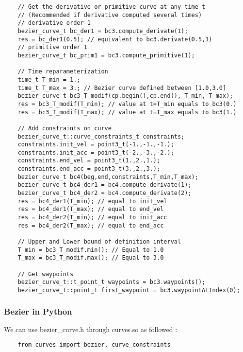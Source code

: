 \documentclass{article}
\begin{document}
\begin{lstlisting}
    // Get the derivative or primitive curve at any time t
    // (Recommended if derivative computed several times)
    // derivative order 1
    bezier_curve_t bc_der1 = bc3.compute_derivate(1);
    res = bc_der1(0.5); // equivalent to bc3.derivate(0.5,1)
    // primitive order 1
    bezier_curve_t bc_prim1 = bc3.compute_primitive(1);

    // Time reparameterization
    time_t T_min = 1.;
    time_t T_max = 3.; // Bezier curve defined between [1.0,3.0]
    bezier_curve_t bc3_T_modif(cp.begin(),cp.end(), T_min, T_max);
    res = bc3_T_modif(T_min); // value at t=T_min equals to bc3(0.)
    res = bc3_T_modif(T_max); // value at t=T_max equals to bc3(1.)

    // Add constraints on curve
    bezier_curve_t::curve_constraints_t constraints;
    constraints.init_vel = point3_t(-1.,-1.,-1.);
    constraints.init_acc = point3_t(-2.,-3.,-2.);
    constraints.end_vel = point3_t(1.,2.,1.);
    constraints.end_acc = point3_t(3.,2.,3.);
    bezier_curve_t bc4(beg,end,constraints,T_min,T_max);
    bezier_curve_t bc4_der1 = bc4.compute_derivate(1);
    bezier_curve_t bc4_der2 = bc4.compute_derivate(2);
    res = bc4_der1(T_min); // equal to init_vel
    res = bc4_der1(T_max); // equal to end_vel
    res = bc4_der2(T_min); // equal to init_acc
    res = bc4_der2(T_max); // equal to end_acc

    // Upper and Lower bound of definition interval
    T_min = bc3_T_modif.min(); // Equal to 1.0
    T_max = bc3_T_modif.max(); // Equal to 3.0

    // Get waypoints
    bezier_curve_t::t_point_t waypoints = bc3.waypoints();
    bezier_curve_t::point_t first_waypoint = bc3.waypointAtIndex(0);
    \end{lstlisting}

    \subsubsection{Bezier in Python}

    We can use bezier\_curve.h through curves.so as followed :

    \begin{lstlisting}
    from curves import bezier, curve_constraints
    \end{lstlisting}
\end{document}
